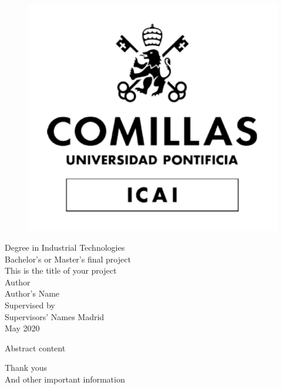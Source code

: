 \documentclass[12pt, a4paper]{book} %
\newenvironment{abstract}%
{\cleardoublepage \null \vfill \begin{center}%
		\bfseries \abstractname \end{center}}%
{\vfill\null}
\begin{document}
	
	\frontmatter %
	\pagestyle{empty} %
	
	\begin{titlepage}
		\begin{figure}
			\centering
			\includegraphics[width=0.3\linewidth]{LogoUniversidadBN}
		\end{figure}
		\centering
		\Large Degree in Industrial Technologies \\ %
		\vspace*{2.5em} %
		\centering
		Bachelor's or Master's final project \\ %
		\vspace*{1em}
		This is the title of your project %
		\\ \large
		\vspace*{3em}
		Author \\ Author's Name \\ %
		\vspace*{1em}
		Supervised by \\ Supervisors' Names %
		\vfill
		Madrid \\
		May 2020 %
	\end{titlepage}
	
	\begin{abstract}
		Abstract content
	\end{abstract}

	\cleardoublepage %

	{\centering Thank yous\\}
	\vfill %
	And other important information
\end{document}

